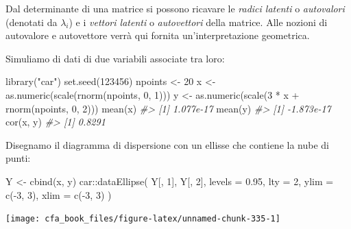 \documentclass[
  11pt,
]{krantz}
\makeatletter
\newenvironment{Shaded}{\begin{snugshade}}{\end{snugshade}}
\newcommand{\AttributeTok}[1]{\textcolor[rgb]{0.61,0.61,0.61}{#1}}
\newcommand{\CommentTok}[1]{\textcolor[rgb]{0.37,0.37,0.37}{\textit{#1}}}
\newcommand{\DecValTok}[1]{\textcolor[rgb]{0.06,0.06,0.06}{#1}}
\newcommand{\FloatTok}[1]{\textcolor[rgb]{0.06,0.06,0.06}{#1}}
\newcommand{\FunctionTok}[1]{\textcolor[rgb]{0,0,0}{#1}}
\newcommand{\NormalTok}[1]{#1}
\newcommand{\OtherTok}[1]{\textcolor[rgb]{0.37,0.37,0.37}{#1}}
\newcommand{\SpecialCharTok}[1]{\textcolor[rgb]{0,0,0}{#1}}
\newcommand{\StringTok}[1]{\textcolor[rgb]{0.5,0.5,0.5}{#1}}
\newenvironment{kframe}{%
\medskip{}
\setlength{\fboxsep}{.8em}
 \def\at@end@of@kframe{}%
 \ifinner\ifhmode%
  \def\at@end@of@kframe{\end{minipage}}%
  \begin{minipage}{\columnwidth}%
 \fi\fi%
 \def\FrameCommand##1{\hskip\@totalleftmargin \hskip-\fboxsep
 \colorbox{shadecolor}{##1}\hskip-\fboxsep
     \hskip-\linewidth \hskip-\@totalleftmargin \hskip\columnwidth}%
 \MakeFramed {\advance\hsize-\width
   \@totalleftmargin\z@ \linewidth\hsize
   \@setminipage}}%
 {\par\unskip\endMakeFramed%
 \at@end@of@kframe}
\renewenvironment{Shaded}{\begin{kframe}}{\end{kframe}}
\theoremstyle{definition}
\theoremstyle{definition}
\theoremstyle{definition}
\theoremstyle{definition}
\theoremstyle{remark}
\makeatother
\begin{document}
Dal determinante di una matrice si possono ricavare le \emph{radici latenti} o \emph{autovalori} (denotati da \(\lambda_i\)) e i \emph{vettori latenti} o \emph{autovettori} della matrice. Alle nozioni di autovalore e autovettore verrà qui fornita un'interpretazione geometrica.

Simuliamo di dati di due variabili associate tra loro:

\begin{Shaded}
\begin{Highlighting}[]
\FunctionTok{library}\NormalTok{(}\StringTok{"car"}\NormalTok{)}
\FunctionTok{set.seed}\NormalTok{(}\DecValTok{123456}\NormalTok{)}
\NormalTok{npoints }\OtherTok{\textless{}{-}} \DecValTok{20}
\NormalTok{x }\OtherTok{\textless{}{-}} \FunctionTok{as.numeric}\NormalTok{(}\FunctionTok{scale}\NormalTok{(}\FunctionTok{rnorm}\NormalTok{(npoints, }\DecValTok{0}\NormalTok{, }\DecValTok{1}\NormalTok{)))}
\NormalTok{y }\OtherTok{\textless{}{-}} \FunctionTok{as.numeric}\NormalTok{(}\FunctionTok{scale}\NormalTok{(}\DecValTok{3} \SpecialCharTok{*}\NormalTok{ x }\SpecialCharTok{+} \FunctionTok{rnorm}\NormalTok{(npoints, }\DecValTok{0}\NormalTok{, }\DecValTok{2}\NormalTok{)))}
\FunctionTok{mean}\NormalTok{(x)}
\CommentTok{\#\textgreater{} [1] 1.077e{-}17}
\FunctionTok{mean}\NormalTok{(y)}
\CommentTok{\#\textgreater{} [1] {-}1.873e{-}17}
\FunctionTok{cor}\NormalTok{(x, y)}
\CommentTok{\#\textgreater{} [1] 0.8291}
\end{Highlighting}
\end{Shaded}

Disegnamo il diagramma di dispersione con un ellisse che contiene la nube di punti:

\begin{Shaded}
\begin{Highlighting}[]
\NormalTok{Y }\OtherTok{\textless{}{-}} \FunctionTok{cbind}\NormalTok{(x, y)}
\NormalTok{car}\SpecialCharTok{::}\FunctionTok{dataEllipse}\NormalTok{(}
\NormalTok{  Y[, }\DecValTok{1}\NormalTok{], Y[, }\DecValTok{2}\NormalTok{],}
  \AttributeTok{levels =} \FloatTok{0.95}\NormalTok{,}
  \AttributeTok{lty =} \DecValTok{2}\NormalTok{,}
  \AttributeTok{ylim =} \FunctionTok{c}\NormalTok{(}\SpecialCharTok{{-}}\DecValTok{3}\NormalTok{, }\DecValTok{3}\NormalTok{),}
  \AttributeTok{xlim =} \FunctionTok{c}\NormalTok{(}\SpecialCharTok{{-}}\DecValTok{3}\NormalTok{, }\DecValTok{3}\NormalTok{)}
\NormalTok{)}
\end{Highlighting}
\end{Shaded}

\begin{center}\texttt{[image: cfa\_book\_files/figure-latex/unnamed-chunk-335-1]} \end{center}
\end{document}
